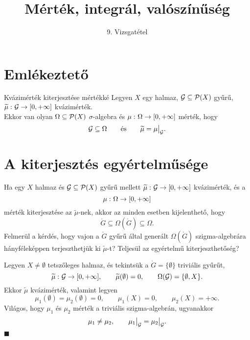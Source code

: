 \documentclass[
]{elteikthesis}[2024/04/26]
\title{Mérték, integrál, valószínűség} %
\subtitle{9. Vizsgatétel}
\begin{document}
	
	
	\section{Emlékeztető}
	
	
	
	\begin{theorem}{Kvázimérték kiterjesztése mértékké}{}
		Legyen \( X \) egy halmaz, 
		\( \mathcal{G} \subseteq \mathcal{P}( X ) \) gyűrű, 
		\( \widetilde{\mu}  \,\colon  \mathcal{G}  \to  [0, +\infty] \) kvázimérték.\\[3pt]
		Ekkor van olyan \( \Omega \subseteq \mathcal{P}( X ) \) \( \sigma \)-algebra és 
		\( \mu  \,\colon  \Omega  \to  [0, +\infty] \) mérték, hogy 
		\[
			\ring{G} \subseteq \Omega
			\qquad \text{és} \qquad
			\widetilde{\mu} = \restr{\mu}{\ring{G}}.
		\]
	\end{theorem}
	
	\section{A kiterjesztés egyértelműsége}
	
	Ha egy \( X \) halmaz és \( \mathcal{G} \subseteq \mathcal{P}( X ) \) gyűrű mellett
	\( \widetilde{\mu} \,\colon \mathcal{G} \to [0, +\infty] \) kvázimérték, és a
	\[
		\mu \,\colon \Omega \to [0, +\infty]
	\]
	mérték kiterjesztése az \( \widetilde{\mu} \)-nek, akkor az minden esetben kijelenthető, hogy
	\[
		\ring{G} \subseteq \Omega( \ring{G} ) \subseteq \Omega.
	\]
	Felmerül a kérdés, hogy vajon a \( \ring{G} \) gyűrű által generált \( \Omega( \ring{G} ) \) szigma-algebrára hányféleképpen terjeszthetjük ki \( \widetilde{\mu} \)-t?
	Teljesül az egyértelmű kiterjeszthetőség?
	
	\begin{example}
		Legyen \( X \neq \emptyset \) tetszőleges halmaz,
		és tekintsük a \( \ring{G} = \{ \emptyset \} \) triviális gyűrűt,
		\[
			\widetilde{\mu} \,\colon \mathcal{G} \to [0, +\infty], \qquad
			\widetilde{\mu}(\emptyset) = 0, \qquad
			\Omega( \mathcal{G} ) = \{ \emptyset, X \}.
		\]
		Ekkor \( \widetilde{ \mu } \) kvázimérték, valamint legyen
		\[
			\mu_1( \emptyset ) = \mu_2( \emptyset ) = 0, \qquad
			\mu_1( X ) = 0, \qquad
			\mu_2( X ) = +\infty.
		\]
		Világos, hogy \( \mu_1 \) és \( \mu_2 \) mérték a triviális szigma-algebrán, ugyanakkor
		\[
			\mu_1 \neq \mu_2, \qquad 
			\restr{ \mu_1 }{ \ring{G} } = \restr{ \mu_2 }{ \ring{G} }.
		\]
		\null\hfill \( \blacksquare \)
	\end{example}
	
\end{document}
